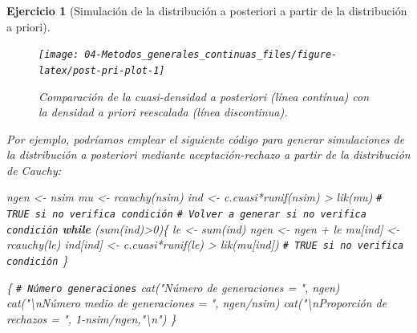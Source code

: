 \documentclass[
  10pt,
]{book}
\newenvironment{Shaded}{\begin{snugshade}}{\end{snugshade}}
\newcommand{\CommentTok}[1]{\textcolor[rgb]{0.56,0.35,0.01}{\textit{#1}}}
\newcommand{\ControlFlowTok}[1]{\textcolor[rgb]{0.13,0.29,0.53}{\textbf{#1}}}
\newcommand{\DecValTok}[1]{\textcolor[rgb]{0.00,0.00,0.81}{#1}}
\newcommand{\FunctionTok}[1]{\textcolor[rgb]{0.00,0.00,0.00}{#1}}
\newcommand{\NormalTok}[1]{#1}
\newcommand{\OtherTok}[1]{\textcolor[rgb]{0.56,0.35,0.01}{#1}}
\newcommand{\SpecialCharTok}[1]{\textcolor[rgb]{0.00,0.00,0.00}{#1}}
\newcommand{\StringTok}[1]{\textcolor[rgb]{0.31,0.60,0.02}{#1}}
\theoremstyle{break}
\newtheorem{exercise}{Ejercicio}[chapter]
\theoremstyle{nonumberplain}
\renewcommand{\CommentTok}[1]{\textcolor[rgb]{0.41,0.41,0.41}{\texttt{#1}}}
\begin{document}
\begin{exercise}[Simulación de la distribución a posteriori a partir de la distribución a priori]
\begin{enumerate}
  \begin{figure}[!htbp]

  {\centering \texttt{[image: 04-Metodos\_generales\_continuas\_files/figure-latex/post-pri-plot-1]} 

  }

  \caption{Comparación de la cuasi-densidad a posteriori (línea contínua) con la densidad a priori reescalada (línea discontinua).}\label{fig:post-pri-plot}
  \end{figure}

  Por ejemplo, podríamos emplear el siguiente código para generar simulaciones de la distribución a posteriori mediante aceptación-rechazo a partir de la distribución de Cauchy:

\begin{Shaded}
\begin{Highlighting}[]
\NormalTok{ngen }\OtherTok{\textless{}{-}}\NormalTok{ nsim}
\NormalTok{mu }\OtherTok{\textless{}{-}} \FunctionTok{rcauchy}\NormalTok{(nsim)}
\NormalTok{ind }\OtherTok{\textless{}{-}}\NormalTok{ c.cuasi}\SpecialCharTok{*}\FunctionTok{runif}\NormalTok{(nsim) }\SpecialCharTok{\textgreater{}} \FunctionTok{lik}\NormalTok{(mu) }\CommentTok{\# TRUE si no verifica condición}
\CommentTok{\# Volver a generar si no verifica condición}
\ControlFlowTok{while}\NormalTok{ (}\FunctionTok{sum}\NormalTok{(ind)}\SpecialCharTok{\textgreater{}}\DecValTok{0}\NormalTok{)\{}
\NormalTok{  le }\OtherTok{\textless{}{-}} \FunctionTok{sum}\NormalTok{(ind)}
\NormalTok{  ngen }\OtherTok{\textless{}{-}}\NormalTok{ ngen }\SpecialCharTok{+}\NormalTok{ le}
\NormalTok{  mu[ind] }\OtherTok{\textless{}{-}} \FunctionTok{rcauchy}\NormalTok{(le)}
\NormalTok{  ind[ind] }\OtherTok{\textless{}{-}}\NormalTok{ c.cuasi}\SpecialCharTok{*}\FunctionTok{runif}\NormalTok{(le) }\SpecialCharTok{\textgreater{}} \FunctionTok{lik}\NormalTok{(mu[ind]) }\CommentTok{\# TRUE si no verifica condición}
\NormalTok{\}}

\NormalTok{\{ }\CommentTok{\# Número generaciones}
  \FunctionTok{cat}\NormalTok{(}\StringTok{"Número de generaciones = "}\NormalTok{, ngen)}
  \FunctionTok{cat}\NormalTok{(}\StringTok{"}\SpecialCharTok{\textbackslash{}n}\StringTok{Número medio de generaciones = "}\NormalTok{, ngen}\SpecialCharTok{/}\NormalTok{nsim)}
  \FunctionTok{cat}\NormalTok{(}\StringTok{"}\SpecialCharTok{\textbackslash{}n}\StringTok{Proporción de rechazos = "}\NormalTok{, }\DecValTok{1}\SpecialCharTok{{-}}\NormalTok{nsim}\SpecialCharTok{/}\NormalTok{ngen,}\StringTok{"}\SpecialCharTok{\textbackslash{}n}\StringTok{"}\NormalTok{)}
\NormalTok{\}}
\end{Highlighting}
\end{Shaded}


\end{enumerate}
\end{exercise}
\end{document}
